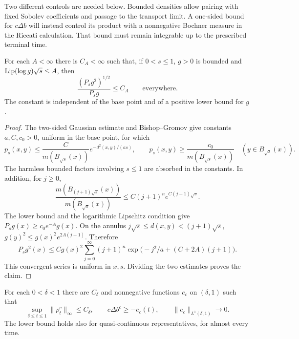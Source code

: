 Two different controls are needed below. Bounded densities allow
pairing with fixed Sobolev coefficients and passage to the transport
limit. A one-sided bound for \(c\Delta b\) will instead control its
product with a nonnegative Bochner measure in the Riccati calculation.
That bound must remain integrable up to the prescribed terminal time.

\begin{lemma}
\label{heat:kernel-ratio}
For each \(A<\infty\) there is \(C_A<\infty\) such that, if
\(0<s\le1\), \(g>0\) is bounded and
\(\operatorname{Lip}(\log g)\sqrt{s}\le A\), then
\begin{equation}
\label{heat:kernel-ratio-estimate}
\frac{(P_sg^2)^{1/2}}{P_sg}\le C_A
\qquad\text{everywhere.}
\end{equation}
The constant is independent of the base point and of a positive
lower bound for \(g\).
\end{lemma}

\begin{proof}
The two-sided Gaussian estimate and Bishop--Gromov give constants
\(a,C,c_0>0\), uniform in the base point, for which
\[
p_s(x,y)\le\frac{C}{m(B_{\sqrt{s}}(x))}
e^{-d^2(x,y)/(as)},\qquad
p_s(x,y)\ge\frac{c_0}{m(B_{\sqrt{s}}(x))}
\quad(y\in B_{\sqrt{s}}(x)).
\]
The harmless bounded factors involving \(s\le1\) are absorbed
in the constants. In addition, for \(j\ge0\),
\[
\frac{m(B_{(j+1)\sqrt{s}}(x))}{m(B_{\sqrt{s}}(x))}
\le C(j+1)^n e^{C(j+1)\sqrt{s}}.
\]
The lower bound and the logarithmic Lipschitz condition give
\(P_sg(x)\ge c_0e^{-A}g(x)\). On the annulus
\(j\sqrt{s}\le d(x,y)<(j+1)\sqrt{s}\),
\(g(y)^2\le g(x)^2e^{2A(j+1)}\). Therefore
\[
P_sg^2(x)\le Cg(x)^2
\sum_{j=0}^\infty(j+1)^n
\exp\bigl(-j^2/a+(C+2A)(j+1)\bigr).
\]
This convergent series is uniform in \(x,s\). Dividing the two
estimates proves the claim.
\end{proof}

\begin{lemma}
\label{heat:density-laplacian}
For each \(0<\delta<1\) there are \(C_\delta\) and
nonnegative functions \(e_c\) on \((\delta,1)\) such that
\begin{equation}
\label{heat:density-and-error}
\sup_{\delta\le t\le1}\|\rho_t^c\|_\infty\le C_\delta,
\qquad c\Delta b^c\ge-e_c(t),
\qquad \|e_c\|_{L^1(\delta,1)}\longrightarrow0.
\end{equation}
The lower bound holds also for quasi-continuous representatives,
for almost every time.
\end{lemma}

